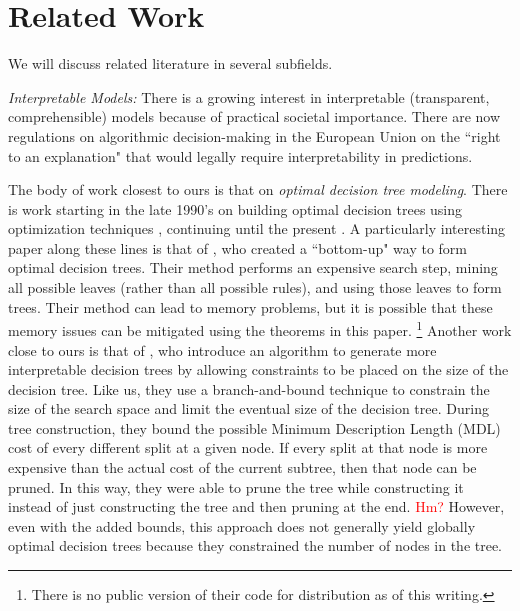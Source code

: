 \documentclass[aoas,preprint]{imsart}
\begin{document}
\section{Related Work}


We will discuss related literature in several subfields.

\textit{Interpretable Models:} There is a growing interest in interpretable (transparent, comprehensible) models because of practical societal importance\citep[see][]{ruping2006learning,bratko1997machine,dawes1979robust,VellidoEtAl12,Giraud98,Holte93,Schmueli10,Huysmans11,Freitas14}. There are now regulations on algorithmic decision-making in the European Union on the ``right to an explanation" \citep{Goodman2016EU} that would legally require interpretability in predictions.


%

The body of work closest to ours is that on \textit{optimal decision tree modeling}. There is work starting in the late 1990's on building optimal decision trees using optimization techniques \citep[e.g.,][]{Bennett96optimaldecision,Auer95theoryand,dobkininduction}, continuing until the present \citep{e.g., farhangfar2008fast}. 
A particularly interesting paper along these lines is that of \citet{NijssenFromont2010}, who created a ``bottom-up" way to form optimal decision trees. Their method performs an expensive search step, mining all possible leaves (rather than all possible rules), and using those leaves to form trees. Their method can lead to memory problems, but it is possible that these memory issues can be mitigated using the theorems in this paper. \footnote{There is no public version of their code for distribution as of this writing.} Another work close to ours is that of \citet{Garofalakis}, who introduce an algorithm to generate more interpretable decision trees by allowing constraints to be placed on the size of the decision tree. Like us, they use a branch-and-bound technique to constrain the size of the search space and limit the eventual size of the decision tree. During tree construction, they bound the possible Minimum Description Length (MDL) cost of every different split at a given node. If every split at that node is more expensive than the actual cost of the current subtree, then that node can be pruned. In this way, they were able to prune the tree while constructing it instead of just constructing the tree and then pruning at the end. \textcolor{red}{Hm?} However, even with the added bounds, this approach does not generally yield globally optimal decision trees because they constrained the number of nodes in the tree.
\end{document}

